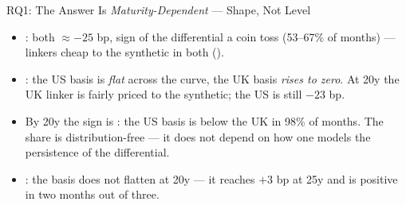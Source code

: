 \begin{frame}[t]{RQ1: The Answer Is \emph{Maturity-Dependent} --- Shape, Not Level}
\vspace{0.12cm}
\raggedright\scriptsize
\begin{itemize}\itemsep=0.05cm\scriptsize
  \item {}: both $\approx-25$ bp, sign of the differential a coin
        toss (53--67\% of months) --- linkers cheap to the synthetic in both ().
  \item {}: the US basis is \emph{flat} across the curve,
        the UK basis \emph{rises to zero}. At 20y the UK linker is fairly priced to the
        synthetic; the US is still $-23$ bp.
  \item By 20y the sign is : the US basis is below the UK in
        98\% of months. The share is distribution-free --- it does not depend on how one
        models the persistence of the differential.
  \item {}: the basis does not flatten
        at 20y --- it reaches $+3$ bp at 25y and is positive in two months out of three.
\end{itemize}

\end{frame}

